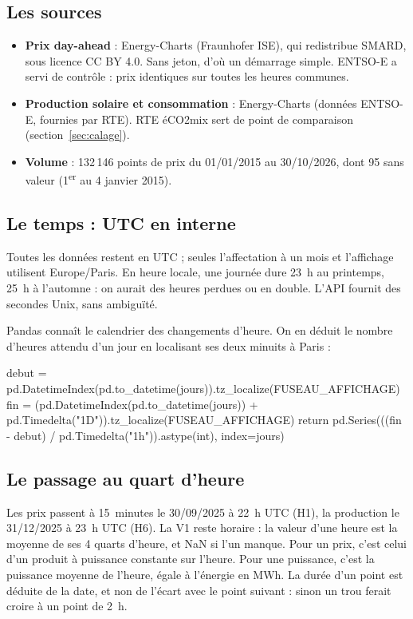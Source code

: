 \documentclass[11pt,a4paper]{article}
\begin{document}
\subsection{Les sources}

\begin{itemize}
\item \textbf{Prix day-ahead} : Energy-Charts (Fraunhofer ISE), qui redistribue SMARD, sous licence CC BY 4.0. Sans jeton,
d'où un démarrage simple. ENTSO-E a servi de contrôle : prix identiques sur toutes les heures communes.
\item \textbf{Production solaire et consommation} : Energy-Charts (données ENTSO-E, fournies par RTE). RTE éCO2mix sert de
point de comparaison (section~\ref{sec:calage}).
\item \textbf{Volume} : 132\,146 points de prix du 01/01/2015 au 30/10/2026, dont 95 sans valeur (1\textsuperscript{er} au 4 janvier 2015).
\end{itemize}

\subsection{Le temps : UTC en interne}

Toutes les données restent en UTC ; seules l'affectation à un mois et l'affichage utilisent Europe/Paris. En heure locale, une
journée dure 23~h au printemps, 25~h à l'automne : on aurait des heures perdues ou en double. L'API fournit des secondes Unix, sans ambiguïté.

Pandas connaît le calendrier des changements d'heure. On en déduit le nombre d'heures attendu d'un jour en localisant ses deux minuits à Paris :
\begin{codepy}
debut = pd.DatetimeIndex(pd.to_datetime(jours)).tz_localize(FUSEAU_AFFICHAGE)
fin = (pd.DatetimeIndex(pd.to_datetime(jours)) + pd.Timedelta("1D")).tz_localize(FUSEAU_AFFICHAGE)
return pd.Series(((fin - debut) / pd.Timedelta("1h")).astype(int), index=jours)
\end{codepy}

\subsection{Le passage au quart d'heure}

Les prix passent à 15~minutes le 30/09/2025 à 22~h UTC (H1), la production le 31/12/2025 à 23~h UTC (H6). La V1 reste horaire : la
valeur d'une heure est la moyenne de ses 4 quarts d'heure, et NaN si l'un manque. Pour un prix, c'est celui d'un produit à puissance constante sur l'heure.
Pour une puissance, c'est la puissance moyenne de l'heure, égale à l'énergie en MWh. La durée d'un point est déduite de la date, et non de l'écart avec le
point suivant : sinon un trou ferait croire à un point de 2~h.
\end{document}
